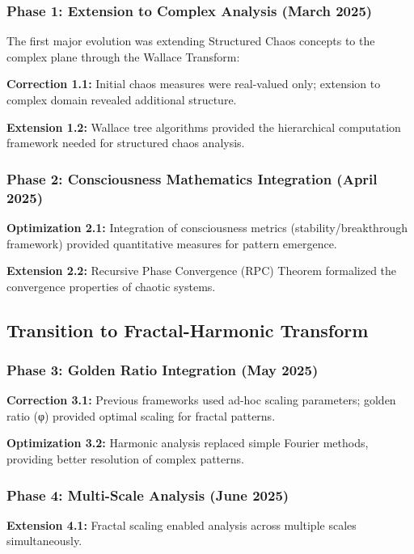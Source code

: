 \documentclass[12pt]{article}
\begin{document}
\subsubsection{Phase 1: Extension to Complex Analysis (March 2025)}

The first major evolution was extending Structured Chaos concepts to the complex plane through the Wallace Transform:

\textbf{Correction 1.1:} Initial chaos measures were real-valued only; extension to complex domain revealed additional structure.

\textbf{Extension 1.2:} Wallace tree algorithms provided the hierarchical computation framework needed for structured chaos analysis.

\subsubsection{Phase 2: Consciousness Mathematics Integration (April 2025)}

\textbf{Optimization 2.1:} Integration of consciousness metrics (stability/breakthrough framework) provided quantitative measures for pattern emergence.

\textbf{Extension 2.2:} Recursive Phase Convergence (RPC) Theorem formalized the convergence properties of chaotic systems.

\subsection{Transition to Fractal-Harmonic Transform}

\subsubsection{Phase 3: Golden Ratio Integration (May 2025)}

\textbf{Correction 3.1:} Previous frameworks used ad-hoc scaling parameters; golden ratio (φ) provided optimal scaling for fractal patterns.

\textbf{Optimization 3.2:} Harmonic analysis replaced simple Fourier methods, providing better resolution of complex patterns.

\subsubsection{Phase 4: Multi-Scale Analysis (June 2025)}

\textbf{Extension 4.1:} Fractal scaling enabled analysis across multiple scales simultaneously.
\end{document}
